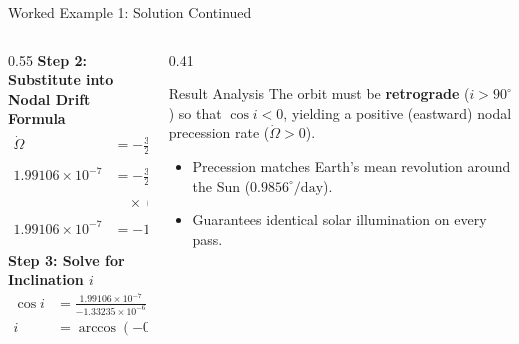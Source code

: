 \documentclass[aspectratio=169,11pt]{beamer}
\begin{document}
\begin{frame}{Worked Example 1: Solution Continued}
    \begin{columns}[t]
        \begin{column}{0.55\textwidth}
            \textbf{Step 2: Substitute into Nodal Drift Formula}
            {\small
            \begin{align*}
                \dot{\Omega} &= -\frac{3}{2} J_2 \left(\frac{R_e}{a}\right)^2 n \cos i \\[3pt]
                1.99106 \times 10^{-7} &= -\frac{3}{2} (1.08263 \times 10^{-3}) \left(\frac{6378.137}{7178.137}\right)^2 \\
                &\quad \times (1.0390 \times 10^{-3}) \cos i \\[3pt]
                1.99106 \times 10^{-7} &= -1.33235 \times 10^{-6} \cos i
            \end{align*}
            }

            \textbf{Step 3: Solve for Inclination $i$}
            {\small
            \begin{align*}
                \cos i &= \frac{1.99106 \times 10^{-7}}{-1.33235 \times 10^{-6}} = -0.14944 \\[3pt]
                i &= \arccos(-0.14944) = \mathbf{98.59^\circ}
            \end{align*}
            }
        \end{column}

        \begin{column}{0.41\textwidth}
            \begin{block}{Result Analysis}
                The orbit must be \textbf{retrograde} ($i > 90^\circ$) so that $\cos i < 0$, yielding a positive (eastward) nodal precession rate ($\dot{\Omega} > 0$).
            \end{block}

            \begin{itemize}
                \item \small Precession matches Earth's mean revolution around the Sun ($0.9856^\circ/\text{day}$).
                \item \small Guarantees identical solar illumination on every pass.
            \end{itemize}
        \end{column}
    \end{columns}
\end{frame}
\end{document}
